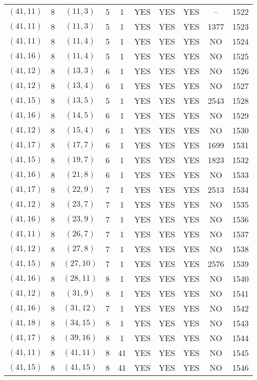 \begin{longtable}{|c|c|c|c|c|c|c|c|c|c|}
$(41, 11)$ & 8 & $(11, 3)$ & 5 & 1 & YES & YES & YES & -- & 1522\\
$(41, 11)$ & 8 & $(11, 3)$ & 5 & 1 & YES & YES & YES & 1377 & 1523\\
$(41, 11)$ & 8 & $(11, 4)$ & 5 & 1 & YES & YES & YES & NO & 1524\\
$(41, 16)$ & 8 & $(11, 4)$ & 5 & 1 & YES & YES & YES & NO & 1525\\
$(41, 12)$ & 8 & $(13, 3)$ & 6 & 1 & YES & YES & YES & NO & 1526\\
$(41, 12)$ & 8 & $(13, 4)$ & 6 & 1 & YES & YES & YES & NO & 1527\\
$(41, 15)$ & 8 & $(13, 5)$ & 5 & 1 & YES & YES & YES & 2543 & 1528\\
$(41, 16)$ & 8 & $(14, 5)$ & 6 & 1 & YES & YES & YES & NO & 1529\\
$(41, 12)$ & 8 & $(15, 4)$ & 6 & 1 & YES & YES & YES & NO & 1530\\
$(41, 17)$ & 8 & $(17, 7)$ & 6 & 1 & YES & YES & YES & 1699 & 1531\\
$(41, 15)$ & 8 & $(19, 7)$ & 6 & 1 & YES & YES & YES & 1823 & 1532\\
$(41, 16)$ & 8 & $(21, 8)$ & 6 & 1 & YES & YES & YES & NO & 1533\\
$(41, 17)$ & 8 & $(22, 9)$ & 7 & 1 & YES & YES & YES & 2513 & 1534\\
$(41, 12)$ & 8 & $(23, 7)$ & 7 & 1 & YES & YES & YES & NO & 1535\\
$(41, 16)$ & 8 & $(23, 9)$ & 7 & 1 & YES & YES & YES & NO & 1536\\
$(41, 11)$ & 8 & $(26, 7)$ & 7 & 1 & YES & YES & YES & NO & 1537\\
$(41, 12)$ & 8 & $(27, 8)$ & 7 & 1 & YES & YES & YES & NO & 1538\\
$(41, 15)$ & 8 & $(27, 10)$ & 7 & 1 & YES & YES & YES & 2576 & 1539\\
$(41, 16)$ & 8 & $(28, 11)$ & 8 & 1 & YES & YES & YES & NO & 1540\\
$(41, 12)$ & 8 & $(31, 9)$ & 8 & 1 & YES & YES & YES & NO & 1541\\
$(41, 16)$ & 8 & $(31, 12)$ & 7 & 1 & YES & YES & YES & NO & 1542\\
$(41, 18)$ & 8 & $(34, 15)$ & 8 & 1 & YES & YES & YES & NO & 1543\\
$(41, 17)$ & 8 & $(39, 16)$ & 8 & 1 & YES & YES & YES & NO & 1544\\
$(41, 11)$ & 8 & $(41, 11)$ & 8 & 41 & YES & YES & YES & NO & 1545\\
$(41, 15)$ & 8 & $(41, 15)$ & 8 & 41 & YES & YES & YES & NO & 1546\\

\end{longtable}
